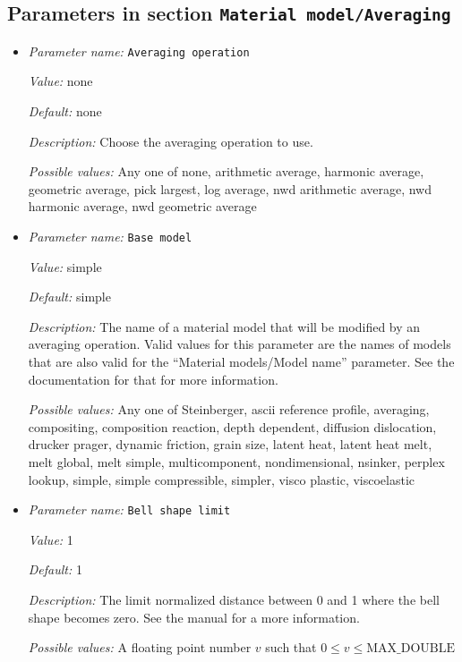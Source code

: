 \subsection{Parameters in section \tt Material model/Averaging}
\label{parameters:Material_20model/Averaging}

\begin{itemize}
\item {\it Parameter name:} {\tt Averaging operation}
\label{parameters:Material model/Averaging/Averaging operation}
\label{parameters:Material_20model/Averaging/Averaging_20operation}


{\it Value:} none


{\it Default:} none


{\it Description:} Choose the averaging operation to use.


{\it Possible values:} Any one of none, arithmetic average, harmonic average, geometric average, pick largest, log average, nwd arithmetic average, nwd harmonic average, nwd geometric average
\item {\it Parameter name:} {\tt Base model}
\label{parameters:Material model/Averaging/Base model}
\label{parameters:Material_20model/Averaging/Base_20model}


{\it Value:} simple


{\it Default:} simple


{\it Description:} The name of a material model that will be modified by an averaging operation. Valid values for this parameter are the names of models that are also valid for the ``Material models/Model name'' parameter. See the documentation for that for more information.


{\it Possible values:} Any one of Steinberger, ascii reference profile, averaging, compositing, composition reaction, depth dependent, diffusion dislocation, drucker prager, dynamic friction, grain size, latent heat, latent heat melt, melt global, melt simple, multicomponent, nondimensional, nsinker, perplex lookup, simple, simple compressible, simpler, visco plastic, viscoelastic
\item {\it Parameter name:} {\tt Bell shape limit}
\label{parameters:Material model/Averaging/Bell shape limit}
\label{parameters:Material_20model/Averaging/Bell_20shape_20limit}


{\it Value:} 1


{\it Default:} 1


{\it Description:} The limit normalized distance between 0 and 1 where the bell shape becomes zero. See the manual for a more information.


{\it Possible values:} A floating point number $v$ such that $0 \leq v \leq \text{MAX\_DOUBLE}$
\end{itemize}

